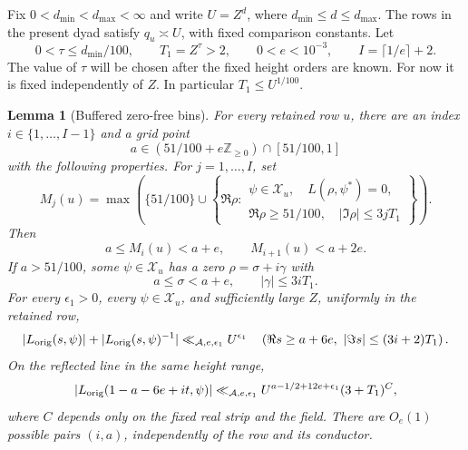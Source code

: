 \documentclass[12pt]{article}
\newtheorem{lemma}[theorem]{Lemma}
\begin{document}
Fix \(0<d_{\min}<d_{\max}<\infty\) and write \(U=Z^d\), where
\(d_{\min}\le d\le d_{\max}\).  The rows in the present dyad satisfy
\(q_u\asymp U\), with fixed comparison constants.  Let
\[
 0<\tau\le d_{\min}/100,\qquad T_1=Z^\tau>2,\qquad
 0<e<10^{-3},\qquad I=\lceil1/e\rceil+2.
\]
The value of \(\tau\) will be chosen after the fixed height orders
are known.  For now it is fixed independently of \(Z\).  In
particular \(T_1\le U^{1/100}\).

\begin{lemma}[Buffered zero-free bins]\label{lem:buffered-bins}
For every retained row \(u\), there are an index
\(i\in\{1,\ldots,I-1\}\) and a grid point
\[
 a\in(51/100+e\mathbb Z_{\ge0})\cap[51/100,1]
\]
with the following properties.  For \(j=1,\ldots,I\), set
\[
 M_j(u)=\max\left(\{51/100\}\cup
 \left\{\Re\rho:
 \begin{array}{l}
  \psi\in\mathcal X_u,\quad L(\rho,\psi^*)=0,\\
  \Re\rho\ge51/100,\quad |\Im\rho|\le3jT_1
 \end{array}\right\}\right).
\]
Then
\[
 a\le M_i(u)<a+e,\qquad M_{i+1}(u)<a+2e.
\]
If \(a>51/100\), some \(\psi\in\mathcal X_u\) has a zero
\(\rho=\sigma+i\gamma\) with
\[
 a\le\sigma<a+e,\qquad |\gamma|\le3iT_1.
\]
For every \(\epsilon_1>0\), every \(\psi\in\mathcal X_u\), and
sufficiently large \(Z\), uniformly in the retained row,
\[
 |L_{\rm orig}(s,\psi)|+|L_{\rm orig}(s,\psi)^{-1}|
 \ll_{\mathcal A,e,\epsilon_1} U^{\epsilon_1}
 \quad
 \left(\Re s\ge a+6e,\ |\Im s|\le(3i+2)T_1\right).
\]
On the reflected line in the same height range,
\[
 |L_{\rm orig}(1-a-6e+it,\psi)|
 \ll_{\mathcal A,e,\epsilon_1}
 U^{a-1/2+12e+\epsilon_1}(3+T_1)^C,
\]
where \(C\) depends only on the fixed real strip and the field.
There are \(O_e(1)\) possible pairs \((i,a)\), independently of
the row and its conductor.
\end{lemma}
\end{document}
